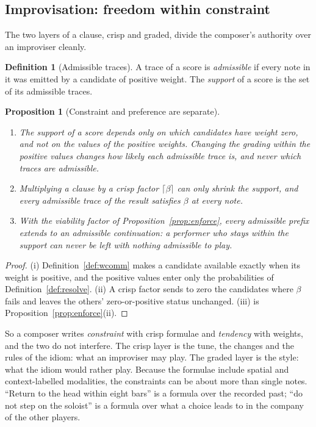 \documentclass[11pt,a4paper]{article}
\theoremstyle{plain}
\newtheorem{proposition}[theorem]{Proposition}
\theoremstyle{definition}
\newtheorem{definition}[theorem]{Definition}
\theoremstyle{remark}
\newcommand{\crisp}[1]{\lceil #1 \rceil}
\begin{document}
\subsection{Improvisation: freedom within constraint}\label{ssec:improv}

The two layers of a clause, crisp and graded, divide the composer's authority
over an improviser cleanly.

\begin{definition}[Admissible traces]\label{def:admissible}
A trace of a score is \emph{admissible} if every note in it was emitted by a
candidate of positive weight. The \emph{support} of a score is the set of its
admissible traces.
\end{definition}

\begin{proposition}[Constraint and preference are separate]\label{prop:support}
\begin{enumerate}[label=(\roman*),itemsep=1pt]
\item The support of a score depends only on which candidates have weight zero,
  and not on the values of the positive weights. Changing the grading within the
  positive values changes how likely each admissible trace is, and never which
  traces are admissible.
\item Multiplying a clause by a crisp factor $\crisp{\beta}$ can only shrink the
  support, and every admissible trace of the result satisfies $\beta$ at every
  note.
\item With the viability factor of Proposition~\ref{prop:enforce}, every
  admissible prefix extends to an admissible continuation: a performer who stays
  within the support can never be left with nothing admissible to play.
\end{enumerate}
\end{proposition}
\begin{proof}
(i) Definition~\ref{def:wcomm} makes a candidate available exactly when its
weight is positive, and the positive values enter only the probabilities of
Definition~\ref{def:resolve}. (ii) A crisp factor sends to zero the candidates
where $\beta$ fails and leaves the others' zero-or-positive status unchanged.
(iii) is Proposition~\ref{prop:enforce}(ii).
\end{proof}

So a composer writes \emph{constraint} with crisp formulae and \emph{tendency}
with weights, and the two do not interfere. The crisp layer is the tune, the
changes and the rules of the idiom: what an improviser may play. The graded
layer is the style: what the idiom would rather play. Because the formulae
include spatial and context-labelled modalities, the constraints can be about
more than single notes. ``Return to the head within eight bars'' is a formula
over the recorded past; ``do not step on the soloist'' is a formula over what a
choice leads to in the company of the other players.
\end{document}
